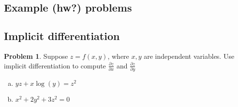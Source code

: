 \documentclass[10pt]{article}
\theoremstyle{definition}
\newtheorem{problem}[theorem]{Problem}
\newcommand{\1}[1]{\textbf{1}_{\left[#1\right]}} %
\begin{document}
\subsection{Example (hw?) problems}

\subsection{Implicit differentiation}
\begin{problem}
  Suppose $z=f(x,y)$, where $x,y$ are independent variables. Use implicit
  differentiation to compute $\frac{\partial z}{\partial x}$ and $\frac{\partial z}{\partial y}$
  \begin{enumerate}[(a)]
    \item $yz+x \log\left(y \right)=z^{2} $
    \item $x^{2}+2y^{2}+3z^{2} =0$
  \end{enumerate}
\end{problem}
\end{document}
